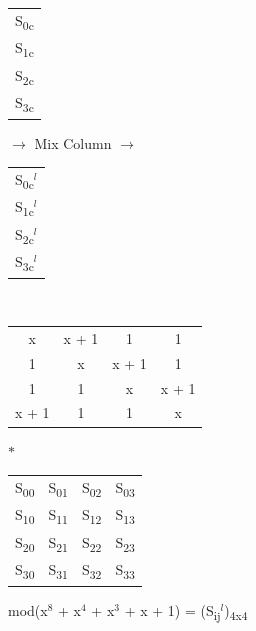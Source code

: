 \documentclass[11pt]{article}
\begin{document}
	\begin{tabular}{|c|}
		S\textsubscript{0c}\\
		S\textsubscript{1c}\\
		S\textsubscript{2c}\\
		S\textsubscript{3c}
	\end{tabular} $\rightarrow$ Mix Column $\rightarrow$ 
	\begin{tabular}{|c|}
		S\textsubscript{0c}$^l$\\
		S\textsubscript{1c}$^l$\\
		S\textsubscript{2c}$^l$\\
		S\textsubscript{3c}$^l$
	\end{tabular}\vspace{0.2cm}\\
	\begin{tabular}{| c c c c |}
		x & x + 1 & 1 & 1\\
		1 & x & x + 1 & 1\\
		1 & 1 & x & x + 1\\
		x + 1 & 1 & 1 & x\\
	\end{tabular} $\ast$
	\begin{tabular}{| c c c c |}
		S\textsubscript{00} & S\textsubscript{01} & S\textsubscript{02} & S\textsubscript{03}\\
		S\textsubscript{10} & S\textsubscript{11} & S\textsubscript{12} & S\textsubscript{13}\\
		S\textsubscript{20} & S\textsubscript{21} & S\textsubscript{22} & S\textsubscript{23}\\
		S\textsubscript{30} & S\textsubscript{31} & S\textsubscript{32} & S\textsubscript{33}
	\end{tabular} mod(x$^8$ + x$^4$ + x$^3$ + x + 1) = (S\textsubscript{ij}$^l$)\textsubscript{4x4}\\
	
\end{document}
